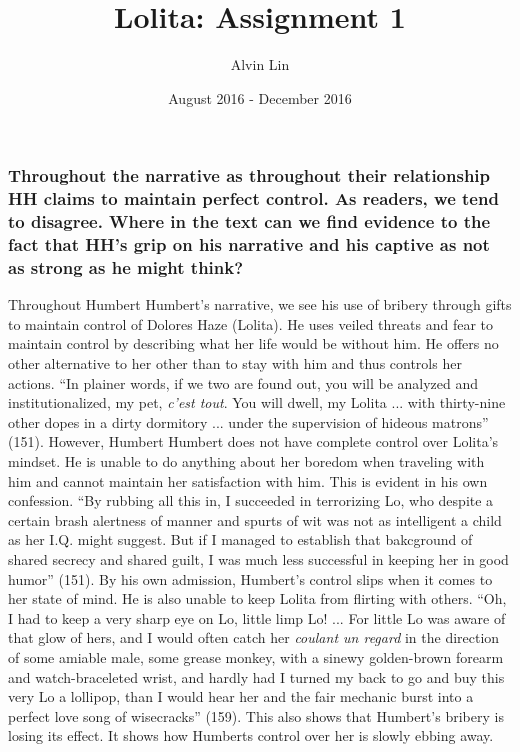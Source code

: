 \documentclass[letterpaper, 12pt]{article}
\title{Lolita: Assignment 1}
\author{Alvin Lin}
\date{August 2016 - December 2016}
\begin{document}
\maketitle

\subsubsection*{Throughout the narrative as throughout their relationship HH
claims to maintain perfect control. As readers, we tend to disagree. Where in
the text can we find evidence to the fact that HH’s grip on his narrative and
his captive as not as strong as he might think?}

Throughout Humbert Humbert's narrative, we see his use of bribery through gifts
to maintain control of Dolores Haze (Lolita). He uses veiled threats and fear to
maintain control by describing what her life would be without him. He offers no
other alternative to her other than to stay with him and thus controls her
actions. ``In plainer words, if we two are found out, you will be analyzed and
institutionalized, my pet, \textit{c'est tout}. You will dwell, my Lolita ...
with thirty-nine other dopes in a dirty dormitory ... under the supervision of
hideous matrons'' (151). However, Humbert Humbert does not have complete control
over Lolita's mindset. He is unable to do anything about her boredom when
traveling with him and cannot maintain her satisfaction with him. This is
evident in his own confession. ``By rubbing all this in, I succeeded in
terrorizing Lo, who despite a certain brash alertness of manner and spurts of
wit was not as intelligent a child as her I.Q. might suggest. But if I managed
to establish that bakcground of shared secrecy and shared guilt, I was much
less successful in keeping her in good humor'' (151). By his own admission,
Humbert's control slips when it comes to her state of mind. He is also unable
to keep Lolita from flirting with others. ``Oh, I had to keep a very sharp eye
on Lo, little limp Lo! ... For little Lo was aware of that glow of hers, and I
would often catch her \textit{coulant un regard} in the direction of some
amiable male, some grease monkey, with a sinewy golden-brown forearm and
watch-braceleted wrist, and hardly had I turned my back to go and buy this very
Lo a lollipop, than I would hear her and the fair mechanic burst into a perfect
love song of wisecracks'' (159). This also shows that Humbert's bribery is
losing its effect. It shows how Humberts control over her is slowly ebbing away.
\end{document}

